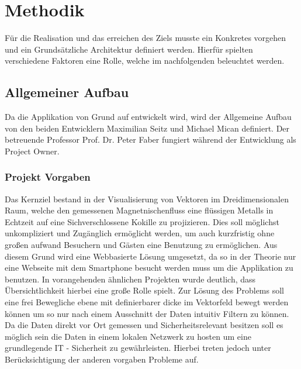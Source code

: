 \section{Methodik}
Für die Realisation und das erreichen des Ziels musste ein Konkretes vorgehen und ein Grundsätzliche Architektur definiert werden. Hierfür spielten verschiedene Faktoren eine Rolle, welche im nachfolgenden beleuchtet werden.

\subsection{Allgemeiner Aufbau}
Da die Applikation von Grund auf entwickelt wird, wird der Allgemeine Aufbau von den beiden Entwicklern Maximilian Seitz und Michael Mican definiert. Der betreuende Professor Prof. Dr. Peter Faber fungiert während der Entwicklung als Project Owner.

\subsubsection{Projekt Vorgaben}
Das Kernziel bestand in der Visualisierung von Vektoren im Dreidimensionalen Raum, welche den gemessenen Magnetnischenfluss eine flüssigen Metalls in Echtzeit auf eine Sichverschlossene Kokille zu projizieren. Dies soll möglichst unkompliziert und Zugänglich ermöglicht werden, um auch kurzfristig ohne großen aufwand Besuchern und Gästen eine Benutzung zu ermöglichen. Aus diesem Grund wird eine Webbasierte Lösung umgesetzt, da so in der Theorie nur eine Webseite mit dem Smartphone besucht werden muss um die Applikation zu benutzen. In vorangehenden ähnlichen Projekten wurde deutlich, dass Übersichtlichkeit hierbei eine große Rolle spielt. Zur Lösung des Problems soll eine frei Bewegliche ebene mit definierbarer dicke im Vektorfeld bewegt werden können um so nur nach einem Ausschnitt der Daten intuitiv Filtern zu können. Da die Daten direkt vor Ort gemessen und Sicherheitsrelevant besitzen soll es möglich sein die Daten in einem lokalen Netzwerk zu hosten um eine grundlegende IT - Sicherheit zu gewährleisten. Hierbei treten jedoch unter Berücksichtigung der anderen vorgaben Probleme auf.


%	
%	


